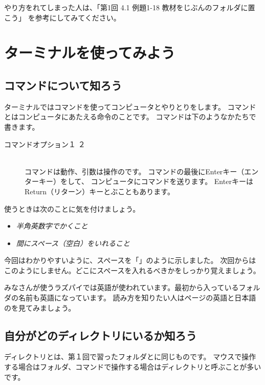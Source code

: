 やり方をれてしまった人は、「第1回 4.1 例題1-18 教材をじぶんのフォルダに置こう」 を参考にしてみてください。

\section{ターミナルを使ってみよう}
\subsection{コマンドについて知ろう}

ターミナルではコマンドを使ってコンピュータとやりとりをします。
コマンドとはコンピュータにあたえる命令のことです。
コマンドは下のようなかたちで書きます。

\begin{description}
\item[コマンド\textvisiblespace オプション\textvisiblespace {}１\textvisiblespace 
{}２]\mbox{}\\
コマンドは動作、引数は操作のです。
 コマンドの最後にEnterキー（エンターキー）をして、
 コンピュータにコマンドを送ります。
 EnterキーはReturn（リターン）キーとぶこともあります。
\end{description}

使うときは次のことに気を付けましょう。
\begin{itemize}
\item \emph{半角英数字でかくこと}
\item \emph{間にスペース（空白）をいれること}
\end{itemize}

今回はわかりやすいように、スペースを「\textvisiblespace 」のように示しました。
次回からはこのようにしません。どこにスペースを入れるべきかをしっかり覚えましょう。

みなさんが使うラズパイでは英語が使われています。最初から入っているフォルダの名前も英語になっています。
読み方を知りたい人は\pageref{英語と日本語の対応表}ページの英語と日本語のを見てみましょう。

\subsection{自分がどのディレクトリにいるか知ろう}
ディレクトリとは、第１回で習ったフォルダとに同じものです。
マウスで操作する場合はフォルダ、コマンドで操作する場合はディレクトリと呼ぶことが多いです。

